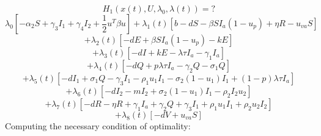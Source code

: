 \documentclass[a4paper]{article}
\begin{document}
\begin{equation*}
H_1\left(x\left(t\right),U,\lambda _0,\lambda \left(t\right)\right)=?
\end{equation*}
\begin{equation*}
\lambda _0\left[-\alpha _2S+\gamma _3I_1+\gamma _4I_2+\frac 1 2u^T\mathit{\beta u}\right]+\lambda
_1\left(t\right)\left[b-\mathit{dS}-\mathit{\beta S}I_a\left(1-u_p\right)+\mathit{\eta R}-u_{\mathit{va}}S\right]
\end{equation*}
\begin{equation*}
+\lambda _2\left(t\right)\left[-\mathit{dE}+\mathit{\beta S}I_a\left(1-u_p\right)-\mathit{kE}\right]
\end{equation*}
\begin{equation*}
+\lambda _3\left(t\right)\left[-\mathit{dI}+\mathit{kE}-\mathit{\lambda \tau }I_a-\gamma _1I_a\right]
\end{equation*}
\begin{equation*}
+\lambda _4\left(t\right)\left[-\mathit{dQ}+\mathit{p\lambda \tau }I_a-\gamma _2Q-\sigma _1Q\right]
\end{equation*}
\begin{equation*}
+\lambda _5\left(t\right)\left[-dI_1+\sigma _1Q-\gamma _3I_1-\rho _1u_1I_1-\sigma
_2\left(1-u_1\right)I_1+\left(1-p\right)\mathit{\lambda \tau }I_a\right]
\end{equation*}
\begin{equation*}
+\lambda _6\left(t\right)\left[-dI_2-mI_2+\sigma _2\left(1-u_1\right)I_1-\rho _2I_2u_2\right]
\end{equation*}
\begin{equation*}
+\lambda _7\left(t\right)\left[-\mathit{dR}-\mathit{\eta R}+\gamma _1I_a+\gamma _2Q+\gamma _3I_1+\rho _1u_1I_1+\rho
_2u_2I_2\right]
\end{equation*}
\begin{equation*}
+\lambda _8\left(t\right)\left[-\mathit{dV}+u_{\mathit{va}}S\right]
\end{equation*}
Computing the necessary condition of optimality:
\end{document}
